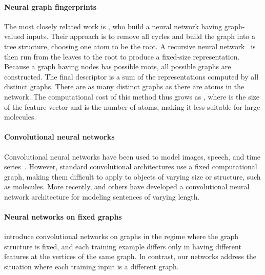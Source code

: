 \documentclass{article}
\newcommand{\citep}{\cite}
\newcommand{\citet}{\cite}
\begin{document}
\paragraph{Neural graph fingerprints}
The most closely related work is \citet{lusci2013deep}, who build a neural network having graph-valued inputs.
Their approach is to remove all cycles and build the graph into a tree structure, choosing one atom to be the root.
A recursive neural network~\citep{socher2011dynamic, socher2011semi} is then run from the leaves to the root to produce a fixed-size representation.
Because a graph having  nodes has  possible roots, all  possible graphs are constructed.
The final descriptor is a sum of the representations computed by all distinct graphs.
There are as many distinct graphs as there are atoms in the network.
The computational cost of this method thus grows as , where  is the size of the feature vector and  is the number of atoms, making it less suitable for large molecules.

\paragraph{Convolutional neural networks}
Convolutional neural networks have been used to model images, speech, and time series~\citep{lecun1995convolutional}.
However, standard convolutional architectures use a fixed computational graph, making them difficult to apply to objects of varying size or structure, such as molecules.
More recently, \cite{KalchbrennerACL2014} and others have developed a convolutional neural network architecture for modeling sentences of varying length.




\paragraph{Neural networks on fixed graphs}
\cite{bruna2013spectral} introduce convolutional networks on graphs in the regime where the graph structure is fixed, and each training example differs only in having different features at the vertices of the same graph.
In contrast, our networks address the situation where each training input is a different graph.
\end{document}
